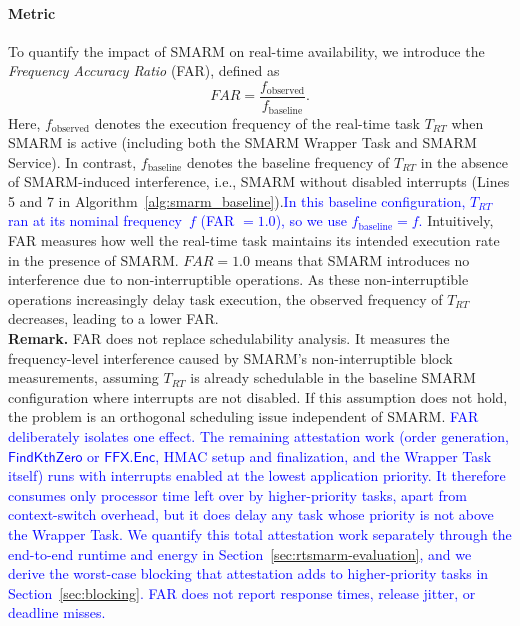 \documentclass[journal]{IEEEtran}
\newcommand\ben[1]{\textcolor{blue}{#1}}
\begin{document}
\paragraph{\textbf{Metric}}
To quantify the impact of SMARM on real-time availability, we 
introduce the \emph{Frequency Accuracy Ratio} (FAR), defined as
\begin{equation}
    FAR = \frac{f_{\text{observed}}}{f_{\text{baseline}}}.
\end{equation}
Here, $f_{\text{observed}}$ denotes the execution frequency of 
the real-time task $T_{RT}$ when SMARM is active (including both 
the SMARM Wrapper Task and SMARM Service).
In contrast, $f_{\text{baseline}}$ denotes the baseline frequency 
of $T_{RT}$ in the absence of SMARM-induced interference, i.e., 
SMARM without disabled interrupts (Lines 5 and 7 in 
Algorithm~\ref{alg:smarm_baseline}).\ben{In this baseline configuration, $T_{RT}$ ran at its nominal frequency~$f$ (FAR $= 1.0$), so we use $f_{\text{baseline}} = f$.}
Intuitively, FAR measures how well the real-time task maintains 
its intended execution rate in the presence of SMARM.
$FAR = 1.0$ means that SMARM introduces no interference due to 
non-interruptible operations.
As these non-interruptible operations increasingly delay task 
execution, the observed frequency of $T_{RT}$ decreases, leading to a lower FAR.~\\


\noindent\textbf{Remark.}
FAR does not replace schedulability analysis.
It measures the frequency-level interference caused by SMARM's non-interruptible block measurements, assuming $T_{RT}$ is already schedulable in the baseline SMARM configuration where interrupts are not disabled.
If this assumption does not hold, the problem is an orthogonal scheduling issue independent of SMARM.
\ben{FAR deliberately isolates one effect.
The remaining attestation work (order generation, $\mathsf{FindKthZero}$ or $\mathsf{FFX.Enc}$, HMAC setup and finalization, and the Wrapper Task itself) runs with interrupts enabled at the lowest application priority.
It therefore consumes only processor time left over by higher-priority tasks, apart from context-switch overhead, but it does delay any task whose priority is not above the Wrapper Task.
We quantify this total attestation work separately through the end-to-end runtime and energy in Section~\ref{sec:rtsmarm-evaluation}, and we derive the worst-case blocking that attestation adds to higher-priority tasks in Section~\ref{sec:blocking}.
FAR does not report response times, release jitter, or deadline misses.}
\end{document}
